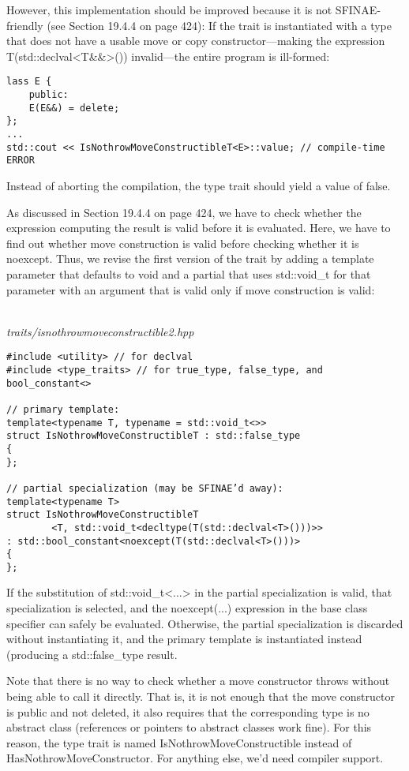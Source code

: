 However, this implementation should be improved because it is not SFINAE-friendly (see Section 19.4.4 on page 424): If the trait is instantiated with a type that does not have a usable move or copy constructor—making the expression T(std::declval<T\&\&>()) invalid—the entire program is ill-formed:

\begin{lstlisting}[style=styleCXX]
lass E {
	public:
	E(E&&) = delete;
};
...
std::cout << IsNothrowMoveConstructibleT<E>::value; // compile-time ERROR
\end{lstlisting}

Instead of aborting the compilation, the type trait should yield a value of false.

As discussed in Section 19.4.4 on page 424, we have to check whether the expression computing the result is valid before it is evaluated. Here, we have to find out whether move construction is valid before checking whether it is noexcept. Thus, we revise the first version of the trait by adding a template parameter that defaults to void and a partial that uses std::void\_t for that parameter with an argument that is valid only if move construction is valid:

\hspace*{\fill} \\ %
\noindent
\textit{traits/isnothrowmoveconstructible2.hpp}
\begin{lstlisting}[style=styleCXX]
#include <utility> // for declval
#include <type_traits> // for true_type, false_type, and bool_constant<>

// primary template:
template<typename T, typename = std::void_t<>>
struct IsNothrowMoveConstructibleT : std::false_type
{
};

// partial specialization (may be SFINAE’d away):
template<typename T>
struct IsNothrowMoveConstructibleT
		<T, std::void_t<decltype(T(std::declval<T>()))>>
: std::bool_constant<noexcept(T(std::declval<T>()))>
{
};
\end{lstlisting}

If the substitution of std::void\_t<...> in the partial specialization is valid, that specialization is selected, and the noexcept(...) expression in the base class specifier can safely be evaluated. Otherwise, the partial specialization is discarded without instantiating it, and the primary template is instantiated instead (producing a std::false\_type result.

Note that there is no way to check whether a move constructor throws without being able to call it directly. That is, it is not enough that the move constructor is public and not deleted, it also requires that the corresponding type is no abstract class (references or pointers to abstract classes work fine). For this reason, the type trait is named IsNothrowMoveConstructible instead of HasNothrowMoveConstructor. For anything else, we’d need compiler support. 

